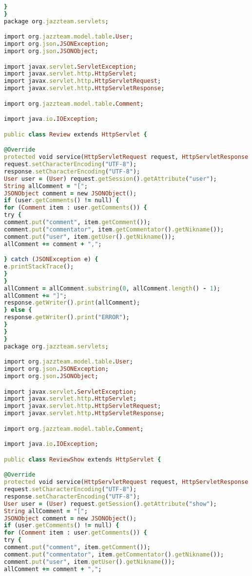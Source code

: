 \begin{lstlisting}[language=Ruby, style=rubystyle]
}
}
package org.jazzteam.servlets;

import org.jazzteam.model.table.User;
import org.json.JSONException;
import org.json.JSONObject;

import javax.servlet.ServletException;
import javax.servlet.http.HttpServlet;
import javax.servlet.http.HttpServletRequest;
import javax.servlet.http.HttpServletResponse;

import org.jazzteam.model.table.Comment;

import java.io.IOException;

public class Review extends HttpServlet {

@Override
protected void service(HttpServletRequest request, HttpServletResponse response) throws ServletException, IOException {
request.setCharacterEncoding("UTF-8");
response.setCharacterEncoding("UTF-8");
User user = (User) request.getSession().getAttribute("user");
String allComment = "[";
JSONObject comment = new JSONObject();
if (user.getComments() != null) {
for (Comment item : user.getComments()) {
try {
comment.put("comment", item.getComment());
comment.put("commentator", item.getCommentator().getNikname());
comment.put("user", item.getUser().getNikname());
allComment += comment + ",";

} catch (JSONException e) {
e.printStackTrace();
}
}
allComment = allComment.substring(0, allComment.length() - 1);
allComment += "]";
response.getWriter().print(allComment);
} else {
response.getWriter().print("ERROR");
}
}
}
package org.jazzteam.servlets;

import org.jazzteam.model.table.User;
import org.json.JSONException;
import org.json.JSONObject;

import javax.servlet.ServletException;
import javax.servlet.http.HttpServlet;
import javax.servlet.http.HttpServletRequest;
import javax.servlet.http.HttpServletResponse;

import org.jazzteam.model.table.Comment;

import java.io.IOException;

public class ReviewShow extends HttpServlet {

@Override
protected void service(HttpServletRequest request, HttpServletResponse response) throws ServletException, IOException {
request.setCharacterEncoding("UTF-8");
response.setCharacterEncoding("UTF-8");
User user = (User) request.getSession().getAttribute("show");
String allComment = "[";
JSONObject comment = new JSONObject();
if (user.getComments() != null) {
for (Comment item : user.getComments()) {
try {
comment.put("comment", item.getComment());
comment.put("commentator", item.getCommentator().getNikname());
comment.put("user", item.getUser().getNikname());
allComment += comment + ",";


\end{lstlisting}
